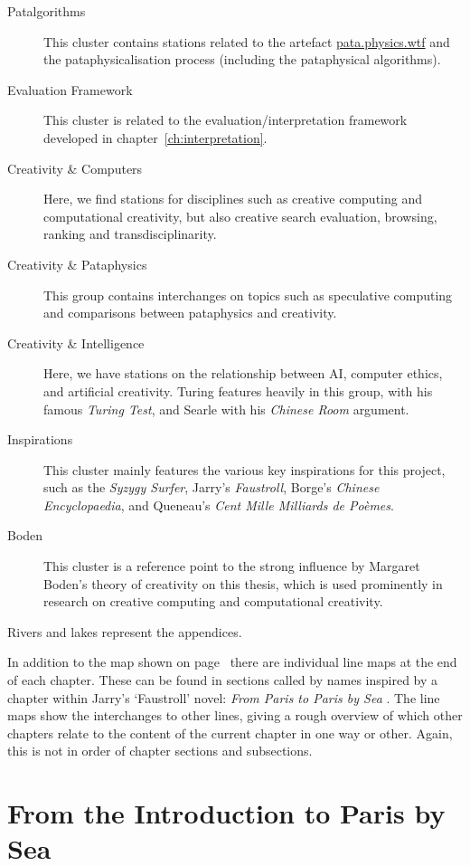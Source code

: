 \begin{description}
  \item [Patalgorithms] This cluster contains stations related to the artefact \url{pata.physics.wtf} and the pataphysicalisation process (including the pataphysical algorithms).
  \item [Evaluation Framework] This cluster is related to the evaluation/interpretation framework developed in chapter~\ref{ch:interpretation}.
  \item [Creativity \& Computers] Here, we find stations for disciplines such as creative computing and computational creativity, but also creative search evaluation, browsing, ranking and transdisciplinarity. 
  \item [Creativity \& Pataphysics] This group contains interchanges on topics such as speculative computing and comparisons between pataphysics and creativity.
  \item [Creativity \& Intelligence] Here, we have stations on the relationship between \acs{AI}, computer ethics, and artificial creativity. Turing features heavily in this group, with his famous \textit{Turing Test}, and Searle with his \textit{Chinese Room} argument.
  \item [Inspirations] This cluster mainly features the various key inspirations for this project, such as the \textit{Syzygy Surfer}, Jarry's \textit{Faustroll}, Borge's \textit{Chinese Encyclopaedia}, and Queneau's \textit{Cent Mille Milliards de Poèmes}.
  \item [Boden] This cluster is a reference point to the strong influence by Margaret Boden's theory of creativity on this thesis, which is used prominently in research on creative computing and computational creativity.
\end{description}

Rivers and lakes represent the appendices. 

\spirals

In addition to the map shown on page~\pageref{map} there are individual line maps at the end of each chapter. These can be found in sections called by names inspired by a chapter within Jarry's `Faustroll' novel: \textit{From Paris to Paris by Sea} \autocite*{Jarry1996}. The line maps show the interchanges to other lines, giving a rough overview of which other chapters relate to the content of the current chapter in one way or other. Again, this is not in order of chapter sections and subsections.


\section{From the Introduction to Paris by Sea}

